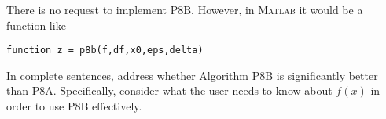 \documentclass[12pt]{amsart}
\newcommand{\Matlab}{\textsc{Matlab}\xspace}
\begin{document}
\begin{enumerate}
\noindent There is no request to implement P8B.  However, in \Matlab it would be a function like

    \centerline{\texttt{function z = p8b(f,df,x0,eps,delta)}}

\noindent In complete sentences, address whether Algorithm P8B is significantly better than P8A.  Specifically, consider what the user needs to know about $f(x)$ in order to use P8B effectively.

\end{enumerate}
\end{document}
